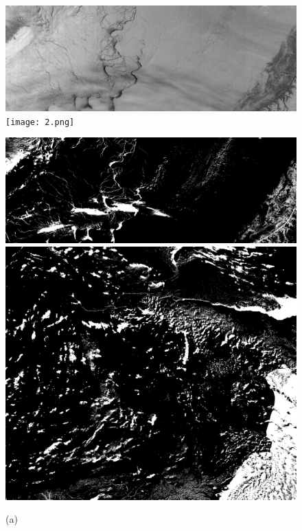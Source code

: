 \documentclass{article}
\begin{document}
        \begin{figure}[ht]
            \centering
            \begin{minipage}{0.32\hsize}
                \centering
                \includegraphics[width = 1\hsize]{1.png}
                \texttt{[image: 2.png]}
                \caption*{(a)}
            \end{minipage}
            \begin{minipage}{0.32\hsize}
                \centering
                \includegraphics[width = 1\hsize]{1_kmeans.png}
                \includegraphics[width = 1\hsize]{2_kmeans.png}

\end{minipage}
\end{figure}
\end{document}
